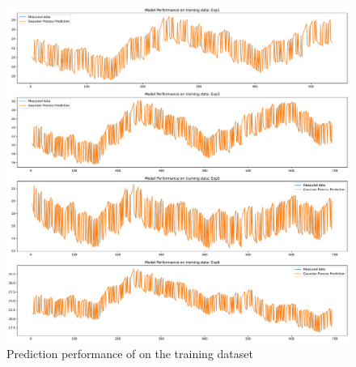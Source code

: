 \clearpage

\subsection{\texorpdfstring{}{313}}

\begin{figure}[ht]
    \centering
    \includegraphics[width = \textwidth]{Plots/GP_313_training_performance.pdf}
    \caption{Prediction performance of  on the training dataset}
    \label{fig:GP_313_train_validation}
\end{figure}

